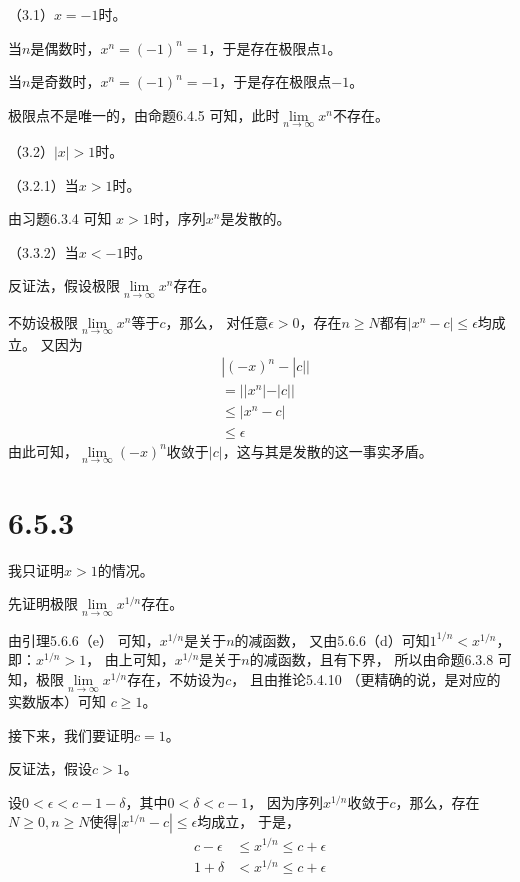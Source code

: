 \documentclass{article}
\theoremstyle{mystyle}
\begin{document}
（3.1）$x=-1$时。

当$n$是偶数时，$x^n = (-1)^n = 1$，于是存在极限点$1$。

当$n$是奇数时，$x^n = (-1)^n = -1$，于是存在极限点$-1$。

极限点不是唯一的，由命题6.4.5 可知，此时$\lim\limits_{n \rightarrow \infty}x^n$不存在。

（3.2）$|x|>1$时。

（3.2.1）当$x > 1$时。

由习题6.3.4 可知 $x > 1$时，序列$x^n$是发散的。

（3.3.2）当$x < -1$时。

反证法，假设极限$\lim\limits_{n \rightarrow \infty}x^n$存在。

不妨设极限$\lim\limits_{n \rightarrow \infty}x^n$等于$c$，那么，
对任意$\epsilon > 0$，存在$n \geq N$都有$|x^n - c| \leq \epsilon$均成立。
又因为
\begin{align*}
   & |(-x)^n - |c||  \\
   & = ||x^n| - |c|| \\
   & \leq |x^n - c|  \\
   & \leq \epsilon
\end{align*}
由此可知，$\lim\limits_{n \rightarrow \infty}(-x)^n$收敛于$|c|$，这与其是发散的这一事实矛盾。

\section*{6.5.3}

我只证明$x > 1$的情况。

先证明极限$\lim\limits_{n \rightarrow \infty}x^{1/n}$存在。

由引理5.6.6（e） 可知，$x^{1/n}$是关于$n$的减函数，
又由5.6.6（d）可知$1^{1/n} < x^{1/n}$，即：$x^{1/n} > 1$，
由上可知，$x^{1/n}$是关于$n$的减函数，且有下界，
所以由命题6.3.8 可知，极限$\lim\limits_{n \rightarrow \infty}x^{1/n}$存在，不妨设为$c$，
且由推论5.4.10 （更精确的说，是对应的实数版本）可知 $c \geq 1$。

接下来，我们要证明$c = 1$。

反证法，假设$c > 1$。

设$0 < \epsilon < c - 1 - \delta$，其中$0 < \delta < c -1$，
因为序列$x^{1/n}$收敛于$c$，那么，存在$N \geq 0, n \geq N$使得$|x^{1/n} -c| \leq \epsilon$均成立，
于是，
\begin{align*}
  c - \epsilon & \leq x^{1/n} \leq c + \epsilon \\
  1 + \delta   & < x^{1/n} \leq c + \epsilon
\end{align*}
\end{document}
